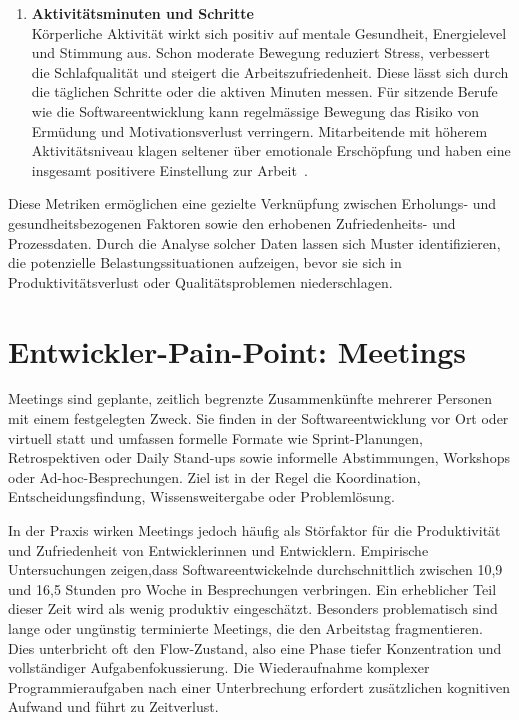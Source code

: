 \documentclass[12pt,a4paper]{report}
\begin{document}
\begin{enumerate}
  \item \textbf{Aktivitätsminuten und Schritte}\\
        Körperliche Aktivität wirkt sich positiv auf mentale Gesundheit, Energielevel und Stimmung aus. Schon moderate Bewegung
        reduziert Stress, verbessert die Schlafqualität und steigert die Arbeitszufriedenheit. Diese lässt sich durch die täglichen
        Schritte oder die aktiven Minuten messen. Für sitzende Berufe wie die Softwareentwicklung kann regelmässige Bewegung das
        Risiko von Ermüdung und Motivationsverlust verringern. Mitarbeitende mit höherem Aktivitätsniveau klagen seltener über
        emotionale Erschöpfung und haben eine insgesamt positivere Einstellung zur Arbeit~\cite{dallmeyer_activity_2023}.
\end{enumerate}


Diese Metriken ermöglichen eine gezielte Verknüpfung zwischen Erholungs- und gesundheitsbezogenen Faktoren sowie den erhobenen
Zufriedenheits- und Prozessdaten. Durch die Analyse solcher Daten lassen sich Muster identifizieren, die potenzielle
Belastungssituationen aufzeigen, bevor sie sich in Produktivitätsverlust oder Qualitätsproblemen niederschlagen. 


\section{Entwickler-Pain-Point: Meetings}

    Meetings sind geplante, zeitlich begrenzte Zusammenkünfte mehrerer Personen mit einem festgelegten Zweck. Sie finden in
    der Softwareentwicklung vor Ort oder virtuell statt und umfassen formelle Formate wie Sprint-Planungen, Retrospektiven
    oder Daily Stand-ups sowie informelle Abstimmungen, Workshops oder Ad-hoc-Besprechungen. Ziel ist in der Regel die
    Koordination, Entscheidungsfindung, Wissensweitergabe oder Problemlösung.

    In der Praxis wirken Meetings jedoch häufig als Störfaktor für die Produktivität und Zufriedenheit von Entwicklerinnen
    und Entwicklern. Empirische Untersuchungen zeigen,dass Softwareentwickelnde durchschnittlich zwischen 10,9 und 16,5
    Stunden pro Woche in Besprechungen verbringen. Ein erheblicher Teil
    dieser Zeit wird als wenig produktiv eingeschätzt. Besonders problematisch sind lange oder ungünstig terminierte Meetings,
    die den Arbeitstag fragmentieren. Dies unterbricht oft den Flow-Zustand, also eine Phase tiefer Konzentration
    und vollständiger Aufgabenfokussierung. Die Wiederaufnahme komplexer Programmieraufgaben nach einer Unterbrechung erfordert
    zusätzlichen kognitiven Aufwand und führt zu Zeitverlust. \cite{stray_understanding_2020, meyer_today_2021}
\end{document}
